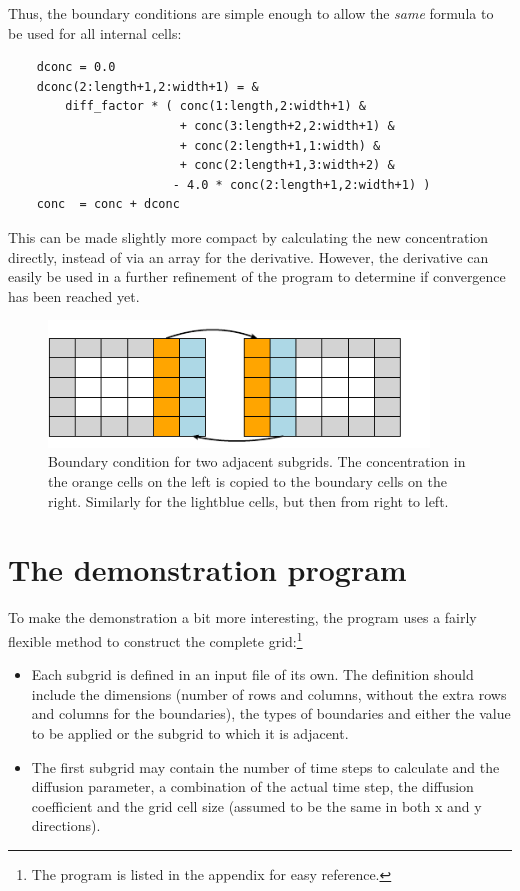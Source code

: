 \documentclass[onecolumn]{article}
\begin{document}
Thus, the boundary conditions are simple enough to allow the \emph{same} formula to be used for all internal cells:
\begin{lstlisting}
    dconc = 0.0
    dconc(2:length+1,2:width+1) = &
        diff_factor * ( conc(1:length,2:width+1) &
                        + conc(3:length+2,2:width+1) &
                        + conc(2:length+1,1:width) &
                        + conc(2:length+1,3:width+2) &
                       - 4.0 * conc(2:length+1,2:width+1) )
    conc  = conc + dconc
\end{lstlisting}

This can be made slightly more compact by calculating the new concentration directly, instead of via an array for the
derivative. However, the derivative can easily be used in a further refinement of the program to determine if convergence has been reached yet.

\begin{figure}[H]
\caption{Boundary condition for two adjacent subgrids. The concentration in the orange cells on the left is copied to the boundary cells on the right.
Similarly for the lightblue cells, but then from right to left.}
\label{adjacent}
\begin{center}
\includegraphics[width=0.9\textwidth]{diagram_adjacent.pdf}
\end{center}
\end{figure}


\section{The demonstration program}
To make the demonstration a bit more interesting, the program uses a fairly flexible method to construct the complete grid:\footnote{The program is listed in the appendix for easy reference.}
\begin{itemize}
\item
Each subgrid is defined in an input file of its own. The definition should include the dimensions (number of rows and columns, without the extra rows and
columns for the boundaries), the types of boundaries and either the value to be applied or the subgrid to which it is adjacent.
\item
The first subgrid may contain the number of time steps to calculate and the diffusion parameter, a combination of the actual time step, the diffusion
coefficient and the grid cell size (assumed to be the same in both x and y directions).
\end{itemize}
\end{document}
